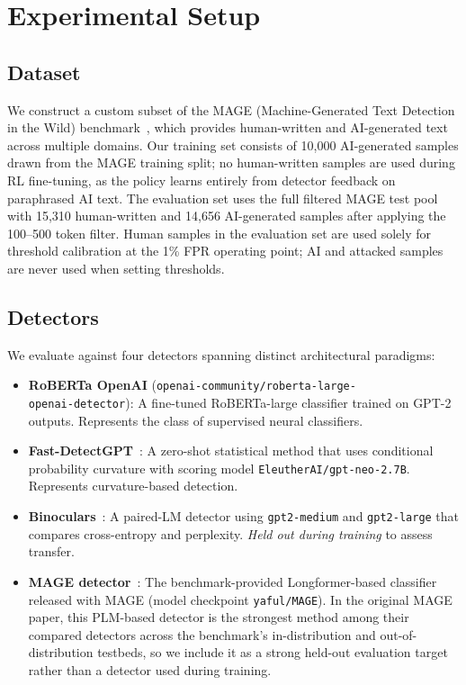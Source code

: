 \documentclass[11pt]{article}
\begin{document}
\section{Experimental Setup}
\label{sec:setup}

\subsection{Dataset}

We construct a custom subset of the MAGE (Machine-Generated Text Detection in the Wild) benchmark~\cite{li2024magemachinegeneratedtextdetection}, which provides human-written and AI-generated text across multiple domains. Our training set consists of 10,000 AI-generated samples drawn from the MAGE training split; no human-written samples are used during RL fine-tuning, as the policy learns entirely from detector feedback on paraphrased AI text. The evaluation set uses the full filtered MAGE test pool with 15,310 human-written and 14,656 AI-generated samples after applying the 100--500 token filter. Human samples in the evaluation set are used solely for threshold calibration at the 1\% FPR operating point; AI and attacked samples are never used when setting thresholds.

\subsection{Detectors}

We evaluate against four detectors spanning distinct architectural paradigms:

\begin{itemize}[leftmargin=*,itemsep=2pt]
  \item \textbf{RoBERTa OpenAI} (\texttt{openai-community/roberta-large-}\\\texttt{openai-detector}): A fine-tuned RoBERTa-large classifier trained on GPT-2 outputs. Represents the class of supervised neural classifiers.
  \item \textbf{Fast-DetectGPT}~\cite{bao2024fastdetectgptefficientzeroshotdetection}: A zero-shot statistical method that uses conditional probability curvature with scoring model \texttt{EleutherAI/gpt-neo-2.7B}. Represents curvature-based detection.
  \item \textbf{Binoculars}~\cite{hans2024spottingllmsbinocularszeroshot}: A paired-LM detector using \texttt{gpt2-medium} and \texttt{gpt2-large} that compares cross-entropy and perplexity. \emph{Held out during training} to assess transfer.
  \item \textbf{MAGE detector}~\cite{li2024magemachinegeneratedtextdetection}: The benchmark-provided Longformer-based classifier released with MAGE (model checkpoint \texttt{yaful/MAGE}). In the original MAGE paper, this PLM-based detector is the strongest method among their compared detectors across the benchmark's in-distribution and out-of-distribution testbeds, so we include it as a strong held-out evaluation target rather than a detector used during training.
\end{itemize}
\end{document}
